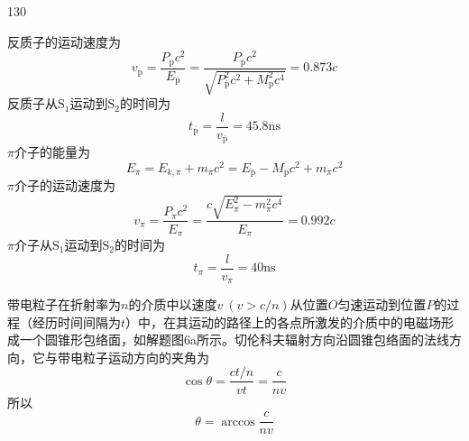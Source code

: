 \begin{solution}{130}
\begin{subsolution}
        反质子的运动速度为
        \begin{equation}
            v _ {\overline {{\mathrm{p}}}} = \frac {P _ {\overline {{\mathrm{p}}}} c ^ {2}}{E _ {\overline {{\mathrm{p}}}}} = \frac {P _ {\overline {{\mathrm{p}}}} c ^ {2}}{\sqrt {P _ {\overline {{\mathrm{p}}}} ^ {2} c ^ {2} + M _ {\mathrm{p}} ^ {2} c ^ {4}}} = 0.873 c
            \label{eq:5.s130}
        \end{equation}
        反质子从$\mathrm{S}_{1}$运动到$\mathrm{S}_{2}$的时间为
        \begin{equation}
            t _ {\overline {{\mathrm{p}}}} = \frac {l}{v _ {\overline {{\mathrm{p}}}}} = 45.8 \mathrm{ns}
            \label{eq:6.s130}
        \end{equation}
        $\pi$介子的能量为
        \begin{equation}
            E _ {\pi} = E _ {k, \pi} + m _ {\pi} c ^ {2} = E _ {\overline {{\mathrm{p}}}} - M _ {\overline {{\mathrm{p}}}} c ^ {2} + m _ {\pi} c ^ {2}
            \label{eq:7.s130}
        \end{equation}
        $\pi$介子的运动速度为
        \begin{equation}
            v _ {\pi} = \frac {P _ {\pi} c ^ {2}}{E _ {\pi}} = \frac {c \sqrt {E _ {\pi} ^ {2} - m _ {\pi} ^ {2} c ^ {4}}}{E _ {\pi}} = 0.992 c
            \label{eq:8.s130}
        \end{equation}
        $\pi$介子从$\mathrm{S}_{1}$运动到$\mathrm{S}_{2}$的时间为
        \begin{equation}
            t _ {\pi} = \frac {l}{v _ {\pi}} = 40 \mathrm{ns}
            \label{eq:9.s130}
        \end{equation}
    \end{subsolution}
    \begin{subsolution}
        带电粒子在折射率为$n$的介质中以速度$v \ ( v > c / n )$从位置$O$匀速运动到位置$P$的过程（经历时间间隔为$t$）中，在其运动的路径上的各点所激发的介质中的电磁场形成一个圆锥形包络面，如解题图6a所示。切伦科夫辐射方向沿圆锥包络面的法线方向，它与带电粒子运动方向的夹角为
        \begin{equation}
            \cos \theta = \frac {c t / n}{v t} = \frac {c}{n v}
            \label{eq:10.s130}
        \end{equation}
        所以
        \begin{equation}
            \theta = \arccos \frac {c}{n v}
            \label{eq:11.s130}
        \end{equation}
    \end{subsolution}

\end{solution}
